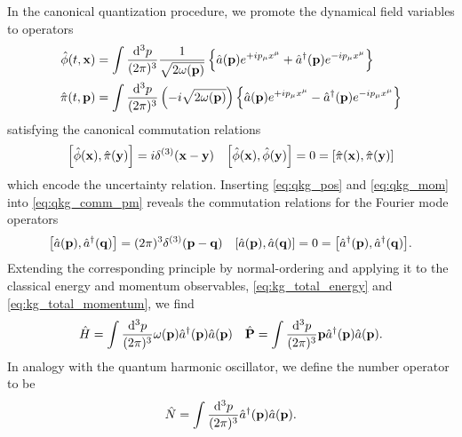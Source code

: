 In the canonical quantization procedure, we promote the dynamical field variables to operators
\begin{align}
	\hat\phi(t,\vb{x})
	&=
	\int\frac{\dd[3]{p}}{(2\pi)^3}
	\frac{1}{\sqrt{2\omega(\vb{p})}}
	\left\{
		\hat{a}(\vb{p})
		e^{+ip_\mu x^\mu}
		+
		\hat{a}^\dagger(\vb{p})
		e^{-ip_\mu x^\mu}
	\right\}
	\label{eq:qkg_pos}
	\\
	\hat\pi(t,\vb{p})
	&=
	\int\frac{\dd[3]{p}}{(2\pi)^3}
	\left(-i\sqrt{2\omega(\vb{p})}\right)
	\left\{
		\hat{a}(\vb{p})
		e^{+ip_\mu x^\mu}
		-
		\hat{a}^\dagger(\vb{p})
		e^{-ip_\mu x^\mu}
	\right\}
	\label{eq:qkg_mom}
\end{align}
satisfying the canonical commutation relations
\begin{align}
	\comm{\hat\phi(\vb{x})}{\hat\pi(\vb{y})}
	=
	i\delta^{(3)}(\vb{x}-\vb{y})
	&&
	\comm{\hat\phi(\vb{x})}{\hat\phi(\vb{y})}
	=
	0
	=
	\comm{\hat\pi(\vb{x})}{\hat\pi(\vb{y})}
	\label{eq:qkg_comm_pm}	
\end{align}
which encode the uncertainty relation.
Inserting \cref{eq:qkg_pos} and \cref{eq:qkg_mom} into \cref{eq:qkg_comm_pm} reveals the commutation relations for the Fourier mode operators
\begin{align}
	\comm{\hat{a}(\vb{p})}{\hat{a}^\dagger(\vb{q})}
	=
	(2\pi)^3\delta^{(3)}(\vb{p}-\vb{q})
	&&
	\comm{\hat{a}(\vb{p})}{\hat{a}(\vb{q})}
	=
	0
	=
	\comm{\hat{a}^\dagger(\vb{p})}{\hat{a}^\dagger(\vb{q})}
	\label{eq:kg_comm_ac}.
\end{align}
Extending the corresponding principle by normal-ordering and applying it to the classical energy and momentum observables, \cref{eq:kg_total_energy} and \cref{eq:kg_total_momentum}, we find
\begin{align}
	\hat{H}
	=
	\int\frac{\dd[3]{p}}{(2\pi)^3}
	\omega(\vb{p})\hat{a}^\dagger(\vb{p})\hat{a}(\vb{p})
	&&
	\hat{\vb{P}}
	=
	\int\frac{\dd[3]{p}}{(2\pi)^3}
	\vb{p}\hat{a}^\dagger(\vb{p})\hat{a}(\vb{p})
	\label{eq:qkg_total_energy_momentum}.
\end{align}
In analogy with the quantum harmonic oscillator, we define the number operator to be
\begin{equation}
	\hat{N}
	=
	\int\frac{\dd[3]{p}}{(2\pi)^3}
	\hat{a}^\dagger(\vb{p})
	\hat{a}(\vb{p})
	\label{eq:qkg_number}.
\end{equation}


